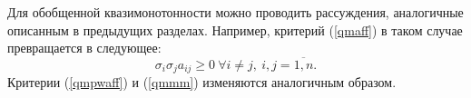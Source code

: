 \documentclass{article}
\renewcommand{\ge}{\geqslant}
\theoremstyle{definition}
\begin{document}
Для обобщенной квазимонотонности можно проводить рассуждения, аналогичные описанным в предыдущих разделах. Например, критерий (\ref{qmaff}) в таком случае превращается в следующее:
\begin{equation}
	\sigma_i \sigma_j a_{ij} \ge 0\ \forall i \neq j,\ i,j = \overline{1, n}.
\end{equation}
Критерии (\ref{qmpwaff}) и (\ref{qmmm}) изменяются аналогичным образом.

\end{document}
